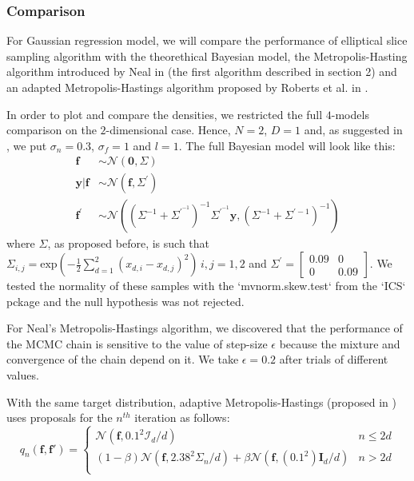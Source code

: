 \documentclass{article}
\begin{document}
\subsubsection{Comparison}
For Gaussian regression model, we will compare the performance of elliptical slice sampling algorithm with the theorethical Bayesian model, the Metropolis-Hasting algorithm introduced by Neal in \cite{Neal} (the first algorithm described in section 2) and an adapted Metropolis-Hastings algorithm proposed by Roberts et al. in \cite{Roberts}.

In order to plot and compare the densities, we restricted the full $4$-models comparison on the $2$-dimensional case. Hence, $N=2$, $D=1$ and, as suggested in \cite{MAM}, we put $\sigma_n=0.3$, $\sigma_f=1$ and $l=1$.
The full Bayesian model will look like this:
\begin{align*}
\mathbf{f}&\sim \mathcal{N}\left(\mathbf{0},\Sigma\right)\\
\mathbf{y}|\mathbf{f}&\sim\mathcal{N}\left(\mathbf{f},\Sigma^{'}\right)\\
\mathbf{f^'}&\sim\mathcal{N}\left(\left(\Sigma^{-1}+\Sigma^{'}^{-1}\right)^{-1}\Sigma^{'}^{-1}\mathbf{y},\left(\Sigma^{-1}+\Sigma^{'-1}\right)^{-1}\right)
\end{align*}
where $\Sigma$, as proposed before, is such that $\Sigma_{i,j}=\text{exp}\left(-\frac{1}{2}\sum_{d=1}^{2}(x_{d,i} - x_{d,j})^2\right)\,i,j=1,2$ and $\Sigma^{'}=\begin{bmatrix}0.09 & 0 \\ 0 & 0.09\end{bmatrix}$.
We tested the normality of these samples with the `mvnorm.skew.test` from the `ICS` pckage and the null hypothesis was not rejected.

For Neal's Metropolis-Hastings algorithm, we discovered that the performance of the MCMC chain is sensitive to the value of step-size $\epsilon$ because the mixture and convergence of the chain depend on it. We take $\epsilon = 0.2$ after trials of different values.

With the same target distribution, adaptive Metropolis-Hastings (proposed in \cite{Gareth}) uses proposals for the $n^{th}$ iteration as follows:\\
\begin{equation}\label{proposal}
    q_n(\mathbf{f},\mathbf{f'}) =
    \begin{cases}
     \mathcal{N}(\mathbf{f},0.1^2\mathcal{I}_d/d) & n\leq 2d \\
        (1-\beta)\mathcal{N}(\mathbf{f},2.38^2\Sigma_n/d) + \beta \mathcal{N}(\mathbf{f},(0.1^2)\mathbf{I}_d/d) & n > 2d \\
    \end{cases}
\end{equation}
\end{document}
